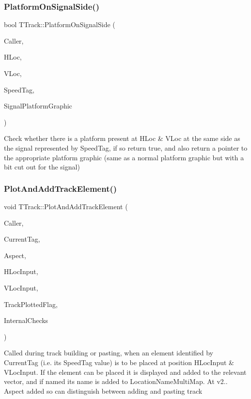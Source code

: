 \subsubsection{\texorpdfstring{Platform\+On\+Signal\+Side()}{PlatformOnSignalSide()}}
{\footnotesize\ttfamily bool T\+Track\+::\+Platform\+On\+Signal\+Side (\begin{DoxyParamCaption}\item[{int}]{Caller,  }\item[{int}]{H\+Loc,  }\item[{int}]{V\+Loc,  }\item[{int}]{Speed\+Tag,  }\item[{Graphics\+::\+T\+Bitmap $\ast$\&}]{Signal\+Platform\+Graphic }\end{DoxyParamCaption})}

Check whether there is a platform present at H\+Loc \& V\+Loc at the same side as the signal represented by Speed\+Tag, if so return true, and also return a pointer to the appropriate platform graphic (same as a normal platform graphic but with a bit cut out for the signal) \mbox{\label{class_t_track_a4385335a5bb0891cdbf2b6d0f0aabdf2}} 
\subsubsection{\texorpdfstring{Plot\+And\+Add\+Track\+Element()}{PlotAndAddTrackElement()}}
{\footnotesize\ttfamily void T\+Track\+::\+Plot\+And\+Add\+Track\+Element (\begin{DoxyParamCaption}\item[{int}]{Caller,  }\item[{int}]{Current\+Tag,  }\item[{int}]{Aspect,  }\item[{int}]{H\+Loc\+Input,  }\item[{int}]{V\+Loc\+Input,  }\item[{bool \&}]{Track\+Plotted\+Flag,  }\item[{bool}]{Internal\+Checks }\end{DoxyParamCaption})}

Called during track building or pasting, when an element identified by Current\+Tag (i.\+e. its Speed\+Tag value) is to be placed at position H\+Loc\+Input \& V\+Loc\+Input. If the element can be placed it is displayed and added to the relevant vector, and if named its name is added to Location\+Name\+Multi\+Map. At v2.. \textquotesingle{}Aspect\textquotesingle{} added so can distinguish between adding and pasting track \mbox{\label{class_t_track_af56adb319c7003b8ddac8e55afaee3d2}} 
